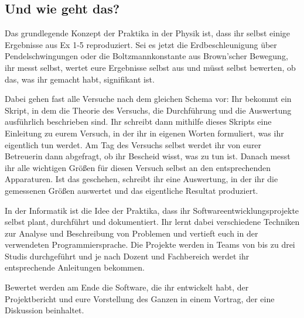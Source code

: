 \subsection{Und wie geht das?}

Das grundlegende Konzept der Praktika in der Physik ist, dass ihr selbst einige Ergebnisse aus \gls{Ex} 1-5 reproduziert. Sei es jetzt die Erdbeschleunigung über Pendelschwingungen oder die Boltzmannkonstante aus Brown'scher Bewegung, ihr messt selbst, wertet eure Ergebnisse selbst aus und müsst selbst bewerten, ob das, was ihr gemacht habt, signifikant ist.

Dabei gehen fast alle Versuche nach dem gleichen Schema vor: Ihr bekommt ein Skript, in dem die Theorie des Versuchs, die Durchführung und die Auswertung ausführlich beschrieben sind. Ihr schreibt dann mithilfe dieses Skripts eine Einleitung zu eurem Versuch, in der ihr in eigenen Worten formuliert, was ihr eigentlich tun werdet. Am Tag des Versuchs selbst werdet ihr von eurer Betreuerin dann abgefragt, ob ihr Bescheid wisst, was zu tun ist. Danach messt ihr alle wichtigen Größen für diesen Versuch selbst an den entsprechenden Apparaturen. Ist das geschehen, schreibt ihr eine Auswertung, in der ihr die gemessenen Größen auswertet und das eigentliche Resultat produziert.

In der Informatik ist die Idee der Praktika, dass ihr Softwareentwicklungsprojekte selbst plant, durchführt und dokumentiert. Ihr lernt dabei verschiedene Techniken zur Analyse und Beschreibung von Problemen und vertieft euch in der verwendeten Programmiersprache. Die Projekte werden in Teams von bis zu drei Studis durchgeführt und je nach Dozent und Fachbereich werdet ihr entsprechende Anleitungen bekommen.

Bewertet werden am Ende die Software, die ihr entwickelt habt, der Projektbericht und eure Vorstellung des Ganzen in einem Vortrag, der eine Diskussion beinhaltet.
